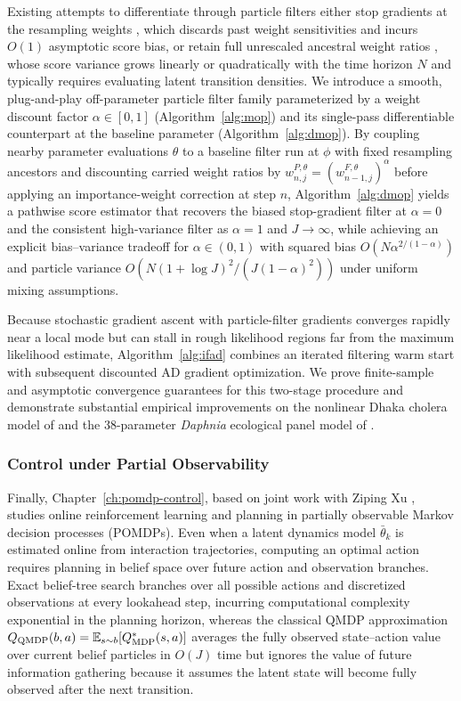 \begin{aigenblock}
Existing attempts to differentiate through particle filters either stop gradients at the resampling weights \citep{naesseth18,jonschkowski18}, which discards past weight sensitivities and incurs $O(1)$ asymptotic score bias, or retain full unrescaled ancestral weight ratios \citep{poyiadjis11,scibior21}, whose score variance grows linearly or quadratically with the time horizon $N$ and typically requires evaluating latent transition densities. We introduce a smooth, plug-and-play off-parameter particle filter family parameterized by a weight discount factor $\alpha \in [0,1]$ (Algorithm~\ref{alg:mop}) and its single-pass differentiable counterpart at the baseline parameter (Algorithm~\ref{alg:dmop}). By coupling nearby parameter evaluations $\theta$ to a baseline filter run at $\phi$ with fixed resampling ancestors and discounting carried weight ratios by $w_{n,j}^{P,\theta} = (w_{n-1,j}^{F,\theta})^\alpha$ before applying an importance-weight correction at step $n$, Algorithm~\ref{alg:dmop} yields a pathwise score estimator that recovers the biased stop-gradient filter at $\alpha = 0$ and the consistent high-variance filter as $\alpha = 1$ and $J \to \infty$, while achieving an explicit bias--variance tradeoff for $\alpha \in (0,1)$ with squared bias $O(N\alpha^{2/(1-\alpha)})$ and particle variance $O(N(1+\log J)^2/(J(1-\alpha)^2))$ under uniform mixing assumptions.

Because stochastic gradient ascent with particle-filter gradients converges rapidly near a local mode but can stall in rough likelihood regions far from the maximum likelihood estimate, Algorithm~\ref{alg:ifad} combines an iterated filtering warm start \citep{ionides15} with subsequent discounted AD gradient optimization. We prove finite-sample and asymptotic convergence guarantees for this two-stage procedure and demonstrate substantial empirical improvements on the nonlinear Dhaka cholera model of \citet{king08} and the 38-parameter \textit{Daphnia} ecological panel model of \citet{yang25daphnia}.

\subsubsection{Control under Partial Observability}

Finally, Chapter~\ref{ch:pomdp-control}, based on joint work with Ziping Xu \citep{tan2026pomdp}, studies online reinforcement learning and planning in partially observable Markov decision processes (POMDPs). Even when a latent dynamics model $\bar{\theta}_k$ is estimated online from interaction trajectories, computing an optimal action requires planning in belief space over future action and observation branches. Exact belief-tree search branches over all possible actions and discretized observations at every lookahead step, incurring computational complexity exponential in the planning horizon, whereas the classical QMDP approximation $Q_{\mathrm{QMDP}}(b,a) = \mathbb{E}_{s \sim b}[Q_{\mathrm{MDP}}^*(s,a)]$ averages the fully observed state--action value over current belief particles in $O(J)$ time but ignores the value of future information gathering because it assumes the latent state will become fully observed after the next transition.


\end{aigenblock}
